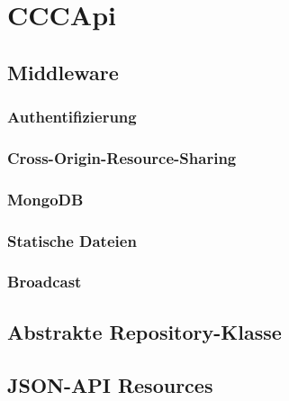 \section{CCCApi}
\label{sec:b-cccapi}

\subsection{Middleware}
\label{ssec:ba-middleware}

\subsubsection{Authentifizierung}
\label{sssec:bam-authentifizierung}

\subsubsection{Cross-Origin-Resource-Sharing}
\label{sssec:bam-cors}

\subsubsection{MongoDB}
\label{sssec:bam-mongodb}

\subsubsection{Statische Dateien}
\label{sssec:bam-statische-dateien}

\subsubsection{Broadcast}
\label{sssec:bam-broadcast}

\subsection{Abstrakte Repository-Klasse}
\label{ssec:ba-abstrakte_repository_klasse}

\subsection{JSON-API Resources}
\label{ssec:ba-json-api-resources}
